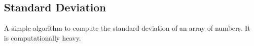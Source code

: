 \subsection{Standard Deviation}
A simple algorithm to compute the standard deviation of an array of numbers. It is computationally heavy.

